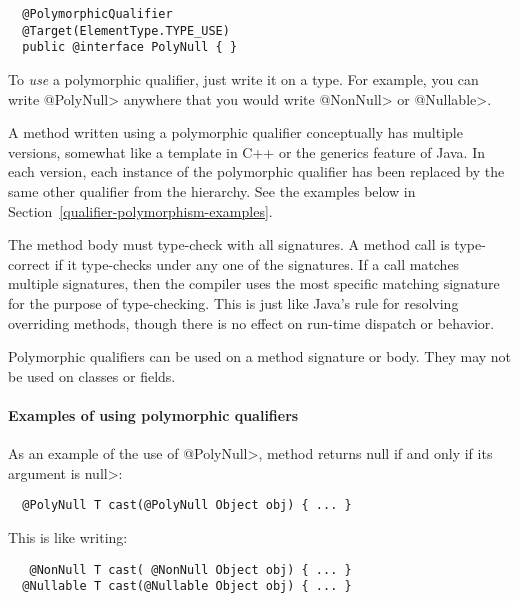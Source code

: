 \begin{Verbatim}
  @PolymorphicQualifier
  @Target(ElementType.TYPE_USE)
  public @interface PolyNull { }
\end{Verbatim}

To \emph{use} a polymorphic qualifier, just write it on a type.
For example, you can write \<@PolyNull> anywhere that you would write
\<@NonNull> or \<@Nullable>.

A method written using a polymorphic qualifier conceptually has multiple
versions, somewhat like a template in C++ or the generics feature of Java.
In each version, each instance of the polymorphic qualifier has been
replaced by the same other qualifier from the hierarchy.  See the examples
below in Section~\ref{qualifier-polymorphism-examples}.

The method body must type-check with all signatures.  A method call is
type-correct if it type-checks under any one of the signatures.  If a call
matches multiple signatures, then the compiler uses the most specific
matching signature for the purpose of type-checking.  This is just like
Java's rule for resolving overriding methods, though there is no effect on
run-time dispatch or behavior.

Polymorphic qualifiers can be used on a method signature or body.
They may not be used on classes or fields.



\paragraph{Examples of using polymorphic qualifiers\label{qualifier-polymorphism-examples}}

As an example of the use of \<@PolyNull>, method 
returns null if and only if its argument is \<null>:

\begin{Verbatim}
  @PolyNull T cast(@PolyNull Object obj) { ... }
\end{Verbatim}

\noindent
This is like writing:

\begin{Verbatim}
   @NonNull T cast( @NonNull Object obj) { ... }
  @Nullable T cast(@Nullable Object obj) { ... }
\end{Verbatim}

